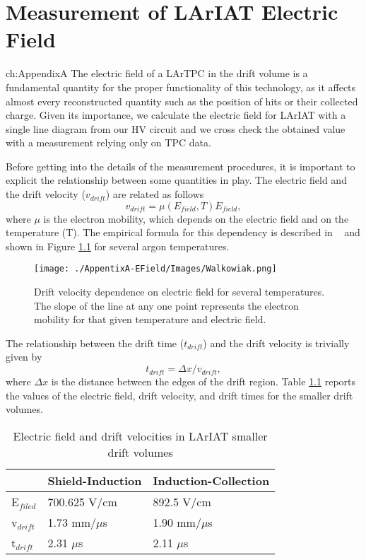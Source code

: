 \chapter{Measurement of LArIAT Electric Field}{ch:AppendixA}
The electric field of a LArTPC in the drift volume is a fundamental quantity for the proper functionality of this technology, as it affects almost every reconstructed quantity such as the position of hits or their collected charge. Given its importance, we calculate the electric field for LArIAT with a single line diagram from our HV circuit and we cross check the obtained value with a measurement relying only on TPC data. 

Before getting into the details of the measurement procedures, it is important to explicit the relationship between some  quantities in play. The electric field and the drift velocity ($v_{drift}$) are related as follows 
\begin{equation} v_{drift} = \mu(E_{field},T) E_{field}, \label{eq:vd}
\end{equation}
where $\mu$ is the electron mobility, which depends on the electric field and on the temperature (T). The empirical formula for this dependency is described in ~\cite{WWW} and shown in Figure \ref{fig:EV} for several argon temperatures.

\begin{figure}[htb]
\centering
\texttt{[image: ./AppentixA-EField/Images/Walkowiak.png]}\\
\caption{Drift velocity dependence on electric field for several temperatures. The slope of the line at any one point represents the electron mobility for that given temperature and electric field.}
\label{fig:EV}
\end{figure}



The relationship between the drift time ($t_{drift}$) and the drift velocity is trivially given by
\begin{equation}
t_{drift} = \Delta x/v_{drift}, \label{eq:drifttime}
\end{equation}
where $\Delta x$ is the distance between the edges of the drift region.
Table \ref{tab:Efields} reports the values of the electric field, drift velocity, and drift times for the smaller drift volumes. 

\begin{table}[]
\centering
\caption{Electric field and drift velocities in LArIAT smaller drift volumes}
\label{tab:Efields}
\begin{tabular}{|l|l|l|}
\hline
& Shield-Induction & Induction-Collection \\ \hline
E$_{filed}$ &                 700.625 V/cm        &                892.5  V/cm             \\ \hline
v$_{drift}$ &                   1.73  mm/$\mu$s   &                  1.90 mm/$\mu$s        \\ \hline
t$_{drift}$ &                   2.31  $\mu$s      &                   2.11 $\mu$s          \\ \hline

\end{tabular}
\end{table}

